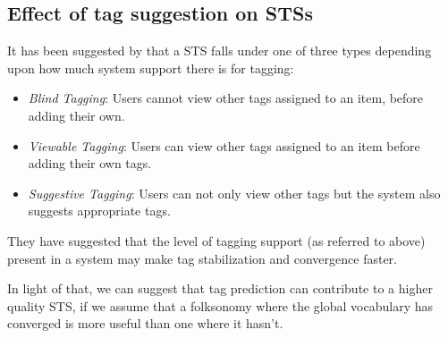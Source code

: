 \subsection{Effect of tag suggestion on STSs}

It has been suggested by \cite{marlow_etal_2006} that a STS falls under one of three types depending upon how much system support there is for tagging:

\begin{itemize}[noitemsep]
\item \textit{Blind Tagging}: Users cannot view other tags assigned to an item, before adding their own.
\item \textit{Viewable Tagging}: Users can view other tags assigned to an item before adding their own tags.
\item \textit{Suggestive Tagging}: Users can not only view other tags but the system also suggests appropriate tags.\citep{marlow_etal_2006}
\end{itemize}

They have suggested that the level of tagging support (as referred to above) present in a system may make tag stabilization and convergence faster.

In light of that, we can suggest that tag prediction can contribute to a higher quality STS, if we assume that a folksonomy where the global vocabulary has converged is more useful than one where it hasn't.


